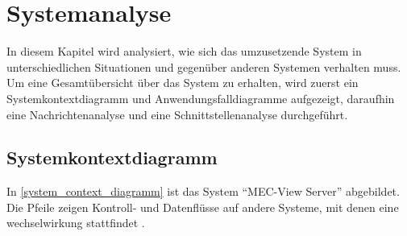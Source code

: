 

\chapter{Systemanalyse}
\label{analysis}

In diesem Kapitel wird analysiert, wie sich das umzusetzende System in unterschiedlichen Situationen und gegenüber anderen Systemen verhalten muss.
Um eine Gesamtübersicht über das System zu erhalten, wird zuerst ein Systemkontextdiagramm und Anwendungsfalldiagramme aufgezeigt, daraufhin eine Nachrichtenanalyse und eine Schnittstellenanalyse durchgeführt.



\section{Systemkontextdiagramm}
\label{system_context}


In \autoref{system_context_diagramm} ist das System \enquote{MEC-View Server} abgebildet.
Die Pfeile zeigen Kontroll- und Datenflüsse auf andere  Systeme, mit denen eine wechselwirkung stattfindet \cite[501]{goll2012methoden}.

